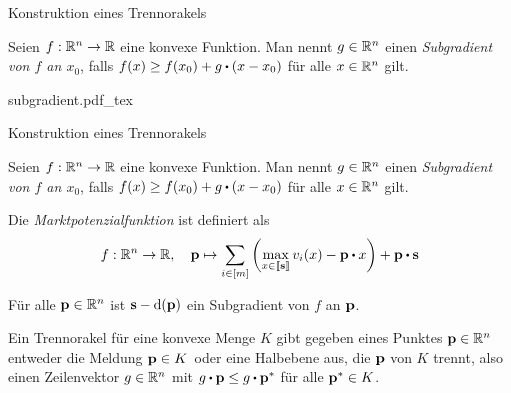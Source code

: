 \begin{frame}[t]{Konstruktion eines Trennorakels}
\begin{definition}[Subgradient]
	Seien $f:\mathbb{R}^n \rightarrow \mathbb{R}$ eine konvexe Funktion.
	Man nennt $g\in\mathbb{R}^n$ einen \emph{Subgradient von $f$ an $x_0$}, falls $f(x)\geq f(x_0) + g \bcdot (x - x_0)$ für alle $x\in\mathbb{R}^n$ gilt.
\end{definition}
\def\svgwidth{\columnwidth}
	{subgradient.pdf_tex}
\end{frame}

\begin{frame}[t]{Konstruktion eines Trennorakels}
\addtocounter{theorem}{-1}
\vspace{0.2em}
\begin{definition}[Subgradient]
	Seien $f:\mathbb{R}^n \rightarrow \mathbb{R}$ eine konvexe Funktion.
	Man nennt $g\in\mathbb{R}^n$ einen \emph{Subgradient von $f$ an $x_0$}, falls $f(x)\geq f(x_0) + g \bcdot (x - x_0)$ für alle $x\in\mathbb{R}^n$ gilt.
\end{definition}
\vspace{-0.4em}
\begin{definition}[Marktpotenzialfunktion]
Die \emph{Marktpotenzialfunktion} ist definiert als
\[ f: \R^n \rightarrow \R, \quad \fp \mapsto \sum_{i\in\first{m}} \left( 
\max_{x\in\ffirst{\fs}} v_i(x) - \fp \bcdot x
\right) + \fp\bcdot \fs \]
\end{definition}
\vspace{-0.4em}
\begin{lemma}
Für alle $\mathbf{p}\in\mathbb{R}^n$ ist $\mathbf{s} - \operatorname{d}(\mathbf{p})$ ein Subgradient von $f$ an $\mathbf{p}$.
\end{lemma}
\vspace{-0.4em}
\begin{definition}[Trennorakel]
	Ein Trennorakel für eine konvexe Menge $K$ gibt gegeben eines Punktes $\mathbf{p}\in\mathbb{R}^n$ entweder die Meldung \glqq $\mathbf{p}\in K$\grqq\ oder eine Halbebene aus, die $\mathbf{p}$ von $K$ trennt, also einen Zeilenvektor $g\in\mathbb{R}^n$ mit $g\bcdot \fp \leq g \bcdot \fp^*$ für alle $\mathbf{p}^*\in K$.
\end{definition}
\end{frame}

